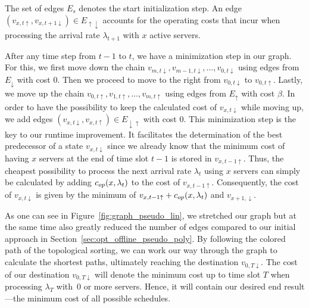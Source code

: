 The set of edges $E_s$ denotes the start initialization step. An edge $(v_{x,t\uparrow},v_{x,t+1\downarrow})\in E_{\uparrow\downarrow}$ accounts for the operating costs that incur when processing the arrival rate $\lambda_{t+1}$ with $x$ active servers.

After any time step from $t-1$ to $t$, we have a minimization step in our graph. For this, we first move down the chain $v_{m,t\downarrow},v_{m-1,t\downarrow},\dotsc,v_{0,t\downarrow}$ using edges from $E_\downarrow$ with cost $0$. Then we proceed to move to the right from $v_{0,t\downarrow}$ to $v_{0,t\uparrow}$. Lastly, we move up the chain $v_{0,t\uparrow},v_{1,t\uparrow},\dotsc,v_{m,t\uparrow}$ using edges from $E_\uparrow$ with cost $\beta$. In order to have the possibility to keep the calculated cost of $v_{x,t\downarrow}$ while moving up, we add edges $(v_{x,t\downarrow},v_{x,t\uparrow})\in E_{\downarrow\uparrow}$ with cost $0$.  
This minimization step is the key to our runtime improvement. It facilitates the determination of the best predecessor of a state $v_{x,t\downarrow}$ since we already know that the minimum cost of having $x$ servers at the end of time slot $t-1$ is stored in $v_{x,t-1\uparrow}$. Thus, the cheapest possibility to process the next arrival rate $\lambda_t$ using $x$ servers can simply be calculated by adding $c_{op}(x,\lambda_t)$ to the cost of $v_{x,t-1\uparrow}$. Consequently, the cost of $v_{x,t\downarrow}$ is given by the minimum of $v_{x,t-1\uparrow}+c_{op}(x,\lambda_t)$ and $v_{x+1,\downarrow}$.

As one can see in Figure~\ref{fig:graph_pseudo_lin}, we stretched our graph but at the same time also greatly reduced the number of edges compared to our initial approach in Section~\ref{sec:opt_offline_pseudo_poly}. By following the colored path of the topological sorting, we can work our way through the graph to calculate the shortest paths, ultimately reaching the destination $v_{0,T\downarrow}$. The cost of our destination $v_{0,T\downarrow}$ will denote the minimum cost up to time slot $T$ when processing $\lambda_T$ with~$0$ or more servers. Hence, it will contain our desired end result---the minimum cost of all possible schedules.

